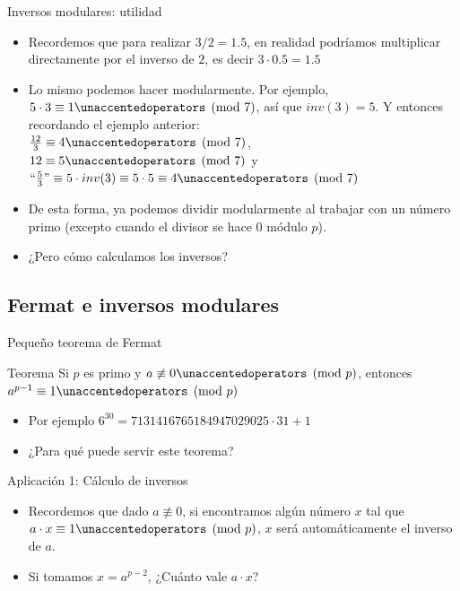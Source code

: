 \documentclass{beamer}
\begin{document}
\begin{frame}{Inversos modulares: utilidad}
    \begin{itemize}
        \item Recordemos que para realizar $3 / 2 = 1.5$, en realidad podríamos multiplicar directamente por el inverso de $2$, es decir $3 \cdot 0.5 = 1.5$
        \item Lo mismo podemos hacer modularmente. Por ejemplo, $5 \cdot 3 \equiv 1 \modulo{7}$, así que $inv(3)=5$. Y entonces recordando el ejemplo anterior:\\
               $\frac{12}{3}\equiv 4 \modulo{7}$, \\ $12 \equiv 5 \modulo{7}$ y \\$\mbox{``}\frac{5}{3}\mbox{''} \equiv 5 \cdot inv(3) \equiv 5 \cdot 5 \equiv 4 \modulo{7}$ 
        \item De esta forma, ya podemos dividir modularmente al trabajar con un número primo (excepto cuando el divisor se hace $0$ módulo $p$).
        \item ¿Pero cómo calculamos los inversos?
    \end{itemize}

\end{frame}

\subsection{Fermat e inversos modulares}

\begin{frame}{Pequeño teorema de Fermat}
  \begin{block}{Teorema}
  Si $p$ es primo y $a \not \equiv 0 \modulo{p}$, entonces $a^{p-1} \equiv 1 \modulo{p}$
  \end{block}
  \begin{itemize}
      \item Por ejemplo $6^{30} = 7131416765184947029025 \cdot 31 + 1$
      \item ¿Para qué puede servir este teorema?
  \end{itemize}
\end{frame}

\begin{frame}{Aplicación 1: Cálculo de inversos}
  \begin{itemize}
      \item Recordemos que dado $a \not \equiv 0$, si encontramos algún número $x$ tal que $a \cdot x \equiv 1 \modulo{p}$, $x$ será automáticamente el inverso de $a$.
      \item Si tomamos $x = a^{p-2}$, ¿Cuánto vale $a \cdot x$?
      \pause
  \end{itemize}
\end{frame}
\end{document}
